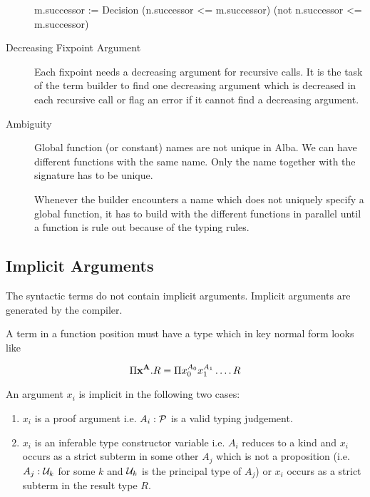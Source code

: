 \begin{description}
\begin{alba}
        m.successor :=
          Decision (n.successor <= m.successor)
                   (not n.successor <= m.successor)
  \end{alba}




\item[Decreasing Fixpoint Argument]
  Each fixpoint needs a decreasing argument for recursive calls. It is the
  task of the term builder to find one decreasing argument which is decreased
  in each recursive call or flag an error if it cannot find a decreasing
  argument.



\item[Ambiguity]
  Global function (or constant) names are not unique in Alba. We can have
  different functions with the same name. Only the name together with the
  signature has to be unique.

  Whenever the builder encounters a name which does not uniquely specify a
  global function, it has to build with the different functions in parallel
  until a function is rule out because of the typing rules.

\end{description}




\subsection{Implicit Arguments}

The syntactic terms do not contain implicit arguments. Implicit arguments are
generated by the compiler.

A term in a function position must have a type which in key normal form looks
like

$$
\Pi \mathbf{x}^{\mathbf{A}} . R = \Pi x_0^{A_0} x_1^{A_1} \ldots .\, R
$$

An argument $x_i$ is implicit in the following two cases:

\begin{enumerate}
\item $x_i$ is a proof argument i.e. $A_i : {\cal{P}}$ is a valid typing
  judgement.

\item $x_i$ is an inferable type constructor variable i.e. $A_i$ reduces to a
  kind and $x_i$ occurs as a strict subterm in some other $A_j$ which is not a
  proposition (i.e. $A_j:{\cal{U}}_k$ for some $k$ and ${\cal{U}}_k$ is the principal
  type of $A_j$) or $x_i$ occurs as a strict subterm in the result type $R$.
\end{enumerate}

